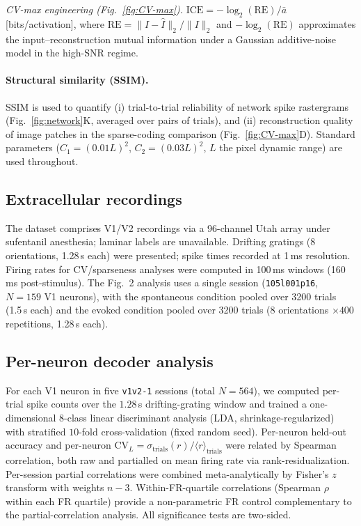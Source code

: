 \emph{CV-max engineering (Fig.~\ref{fig:CV-max}).}  $\mathrm{ICE}=-\log_2(\mathrm{RE})/\bar a$ [bits/activation], where $\mathrm{RE}=\|I-\hat I\|_2/\|I\|_2$ and $-\log_2(\mathrm{RE})$ approximates the input--reconstruction mutual information under a Gaussian additive-noise model in the high-SNR regime.

\paragraph{Structural similarity (SSIM).}
SSIM \cite{wang2004image} is used to quantify (i) trial-to-trial reliability of network spike rastergrams (Fig.~\ref{fig:network}K, averaged over pairs of trials), and (ii) reconstruction quality of image patches in the sparse-coding comparison (Fig.~\ref{fig:CV-max}D).  Standard parameters ($C_1=(0.01L)^2$, $C_2=(0.03L)^2$, $L$ the pixel dynamic range) are used throughout.


\subsection{Extracellular recordings}
The dataset \cite{23} comprises V1/V2 recordings via a 96-channel Utah array under sufentanil anesthesia; laminar labels are unavailable.  Drifting gratings (8 orientations, 1.28\,s each) were presented; spike times recorded at 1\,ms resolution.  Firing rates for CV/sparseness analyses were computed in 100\,ms windows (160\,ms post-stimulus).  The Fig.~2 analysis uses a single session (\texttt{105l001p16}, $N=159$ V1 neurons), with the spontaneous condition pooled over 3200 trials (1.5\,s each) and the evoked condition pooled over 3200 trials ($8$ orientations $\times 400$ repetitions, 1.28\,s each).

\subsection{Per-neuron decoder analysis}
\label{methods:decoder}
For each V1 neuron in five \texttt{v1v2-1} sessions (total $N=564$), we computed per-trial spike counts over the $1.28$\,s drifting-grating window and trained a one-dimensional 8-class linear discriminant analysis (LDA, shrinkage-regularized) with stratified $10$-fold cross-validation (fixed random seed).  Per-neuron held-out accuracy and per-neuron $\mathrm{CV}_L = \sigma_{\mathrm{trials}}(r)/\langle r\rangle_{\mathrm{trials}}$ were related by Spearman correlation, both raw and partialled on mean firing rate via rank-residualization.  Per-session partial correlations were combined meta-analytically by Fisher's $z$ transform with weights $n-3$.  Within-FR-quartile correlations (Spearman $\rho$ within each FR quartile) provide a non-parametric FR control complementary to the partial-correlation analysis.  All significance tests are two-sided.

